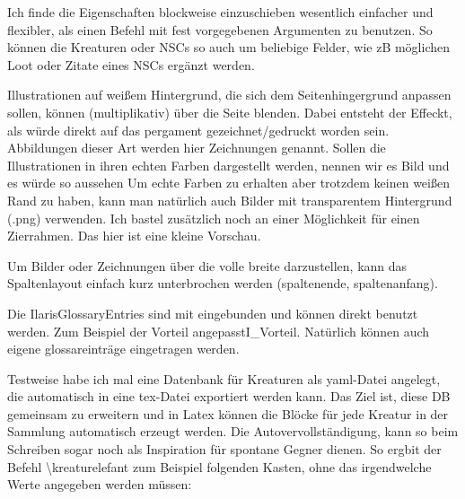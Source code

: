 \documentclass{Ilaris}
\begin{document}
Ich finde die Eigenschaften blockweise einzuschieben wesentlich einfacher und flexibler, als einen Befehl mit fest vorgegebenen Argumenten zu benutzen. So können die Kreaturen oder NSCs so auch um beliebige Felder, wie zB möglichen Loot oder Zitate eines NSCs ergänzt werden.








Illustrationen auf weißem Hintergrund, die sich dem Seitenhingergrund anpassen sollen, können (multiplikativ) über die Seite blenden. Dabei entsteht der Effeckt, als würde direkt auf das pergament gezeichnet/gedruckt worden sein. Abbildungen dieser Art werden hier Zeichnungen genannt.
Sollen die Illustrationen in ihren echten Farben dargestellt werden, nennen wir es Bild und es würde so aussehen
Um echte Farben zu erhalten aber trotzdem keinen weißen Rand zu haben, kann man natürlich auch Bilder mit transparentem Hintergrund (.png) verwenden.
Ich bastel zusätzlich noch an einer Möglichkeit für einen Zierrahmen. Das hier ist eine kleine Vorschau.

Um Bilder oder Zeichnungen über die volle breite darzustellen, kann das Spaltenlayout einfach kurz unterbrochen werden (spaltenende, spaltenanfang).
\spaltenende
{}
\spaltenanfang
{}

Die IlarisGlossaryEntries sind mit eingebunden und können direkt benutzt werden. Zum Beispiel der Vorteil \gls{angepasstI_Vorteil}. Natürlich können auch eigene
\gls{glossareinträge} eingetragen werden.



\spaltenumbruch

Testweise habe ich mal eine Datenbank für Kreaturen als yaml-Datei angelegt, die automatisch in eine tex-Datei exportiert werden kann. Das Ziel ist, diese DB gemeinsam zu erweitern und in Latex können die Blöcke für jede Kreatur in der Sammlung automatisch erzeugt werden. Die Autovervollständigung, kann so beim Schreiben sogar noch als Inspiration für spontane Gegner dienen. So ergbit der Befehl \textbackslash kreaturelefant zum Beispiel folgenden Kasten, ohne das irgendwelche Werte angegeben werden müssen:
\end{document}
